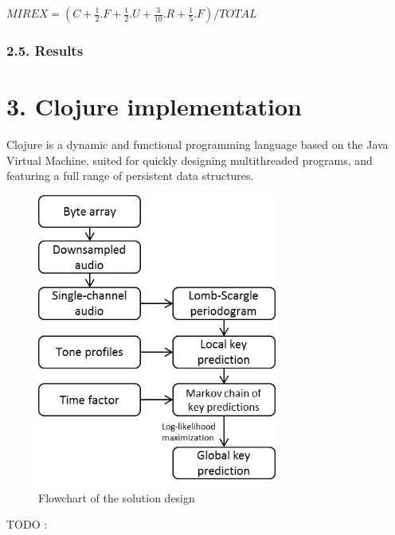 \documentclass[letterpaper]{article}
\begin{document}
$ MIREX = (C + \frac{1}{2}.F + \frac{1}{2}.U + \frac{3}{10}.R + \frac{1}{5}.F) / TOTAL $

\subsubsection*{2.5. Results}

\FloatBarrier

\begin{table}[h!]
\vskip 0.25cm
\caption{Accuracy assessment, according to the raw accuracy and the MIREX index}
\end{table}

\FloatBarrier

\section{3. Clojure implementation}

Clojure is a dynamic and functional programming language based on the Java Virtual Machine, suited for quickly designing multithreaded programs,
and featuring a full range of persistent data structures.

\begin{figure}[h!]
\begin{center}
\includegraphics[width=3.1in,angle=0]{imgs/flowChart.png}
\caption{Flowchart of the solution design}
\label{fig3}
\end{center}
\end{figure}

TODO : \citep{SK}


\footnotesize


\end{document}
